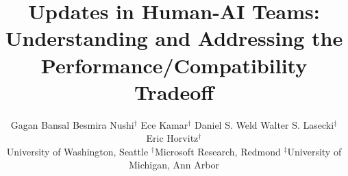 \documentclass[letterpaper]{article} %
\newcommand{\?}{\mbox{?}}
\begin{document}
\title{Updates in Human-AI Teams: \\Understanding and Addressing the Performance/Compatibility Tradeoff}
\author{
Gagan Bansal\hspace{6pt}
Besmira Nushi$^\dagger$\hspace{6pt}
Ece Kamar$^\dagger$\hspace{6pt}
Daniel S. Weld\hspace{6pt}
Walter S. Lasecki$^\ddagger$\hspace{6pt}
Eric Horvitz$^\dagger$\\[2pt]
University of Washington, Seattle\hspace{40pt}
$^\dagger$Microsoft Research, Redmond\hspace{40pt}
$^\ddagger$University of Michigan, Ann Arbor\\
}
\maketitle
\end{document}
